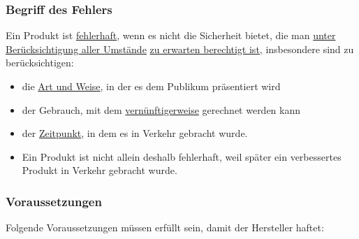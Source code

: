 \subsubsection{Begriff des Fehlers}
Ein Produkt ist \underline{fehlerhaft}, wenn es nicht die Sicherheit bietet, die man \underline{unter Berücksichtigung aller Umstände} \underline{zu erwarten berechtigt ist}, insbesondere sind zu berücksichtigen:
\begin{itemize}
    \item die \underline{Art und Weise}, in der es dem Publikum präsentiert wird
    \item der Gebrauch, mit dem \underline{vernünftigerweise} gerechnet werden kann
    \item der \underline{Zeitpunkt}, in dem es in Verkehr gebracht wurde.
    \item Ein Produkt ist nicht allein deshalb fehlerhaft, weil später ein verbessertes Produkt in Verkehr gebracht wurde.
\end{itemize}

\newpage

\subsubsection{Voraussetzungen}
\label{Produkthaftpflicht:checklist}
Folgende Voraussetzungen müssen erfüllt sein, damit der Hersteller haftet:\\


